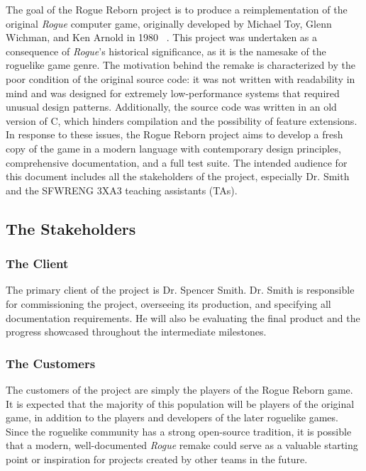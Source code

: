 \documentclass[12pt, titlepage]{article}
\begin{document}
	The goal of the Rogue Reborn project is to produce a reimplementation of the original \textit{Rogue} computer game, originally developed by Michael Toy, Glenn Wichman, and Ken Arnold in 1980 ~\citep{RogueHistory}.  This project was undertaken as a consequence of \textit{Rogue}'s historical significance, as it is the namesake of the roguelike game genre.  The motivation behind the remake is characterized by the poor condition of the original source code: it was not written with readability in mind and was designed for extremely low-performance systems that required unusual design patterns.  Additionally, the source code was written in an old version of C, which hinders compilation and the possibility of feature extensions.  In response to these issues, the Rogue Reborn project aims to develop a fresh copy of the game in a modern language with contemporary design principles, comprehensive documentation, and a full test suite.  The intended audience for this document includes all the stakeholders of the project, especially Dr. Smith and the SFWRENG 3XA3 teaching assistants (TAs).

	\subsection{The Stakeholders}

		\subsubsection{The Client}

		The primary client of the project is Dr. Spencer Smith.  Dr. Smith is responsible for commissioning the project, overseeing its production, and specifying all documentation requirements.  He will also be evaluating the final product and the progress showcased throughout the intermediate milestones.

		\subsubsection{The Customers}

		The customers of the project are simply the players of the Rogue Reborn game. It is expected that the majority of this population will be players of the original game, in addition to the players and developers of the later roguelike games.  Since the roguelike community has a strong open-source tradition, it is possible that a modern, well-documented \textit{Rogue} remake could serve as a valuable starting point or inspiration for projects created by other teams in the future.
\end{document}
